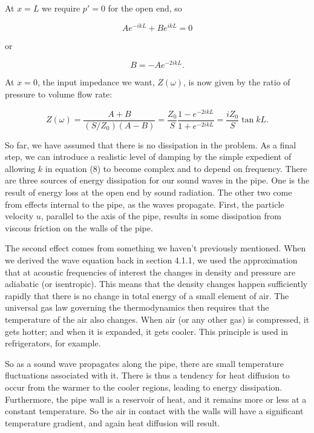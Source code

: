   At $x=L$ we require $p'=0$ for the open end, so 

  \begin{equation*}Ae^{-ikL} +Be^{ikL} =0 \tag{6}\end{equation*} 

  \noindent{}or 

  \begin{equation*}B=-Ae^{-2ikL} . \tag{7}\end{equation*} 

  At $x=0$, the input impedance we want, $Z(\omega)$, is now given by the ratio 
  of pressure to volume flow rate: 

  \begin{equation*}Z(\omega)=\dfrac{A+B}{(S/Z_0) 
  (A-B)}=\dfrac{Z_0}{S}\dfrac{1-e^{-2ikL}}{1+e^{-2ikL}}=\dfrac{iZ_0}{S}\tan kL 
  . \tag{8}\end{equation*} 

  So far, we have assumed that there is no dissipation in the problem. As a 
  final step, we can introduce a realistic level of damping by the simple 
  expedient of allowing $k$ in equation (8) to become complex and to depend on 
  frequency. There are three sources of energy dissipation for our sound waves 
  in the pipe. One is the result of energy loss at the open end by sound 
  radiation. The other two come from effects internal to the pipe, as the waves 
  propagate. First, the particle velocity $u$, parallel to the axis of the 
  pipe, results in some dissipation from viscous friction on the walls of the 
  pipe. 

  The second effect comes from something we haven't previously mentioned. When 
  we derived the wave equation back in section 4.1.1, we used the approximation 
  that at acoustic frequencies of interest the changes in density and pressure 
  are adiabatic (or isentropic). This means that the density changes happen 
  sufficiently rapidly that there is no change in total energy of a small 
  element of air. The universal gas law governing the thermodynamics then 
  requires that the temperature of the air also changes. When air (or any other 
  gas) is compressed, it gets hotter; and when it is expanded, it gets cooler. 
  This principle is used in refrigerators, for example. 

  So as a sound wave propagates along the pipe, there are small temperature 
  fluctuations associated with it. There is thus a tendency for heat diffusion 
  to occur from the warmer to the cooler regions, leading to energy 
  dissipation. Furthermore, the pipe wall is a reservoir of heat, and it 
  remains more or less at a constant temperature. So the air in contact with 
  the walls will have a significant temperature gradient, and again heat 
  diffusion will result. 

